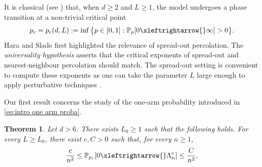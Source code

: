 \documentclass[11pt,a4paper]{article}
\numberwithin{equation}{section}
\theoremstyle{plain}
\newtheorem{Thm}{Theorem}[section]
\theoremstyle{definition}
\newcommand{\connect}{\xleftrightarrow}
\newcommand{\1}{\mathbf 1}
\def\P{\mathbb{P}} %
\def\bf{\bfseries}
\begin{document}
	It is classical (see \cite{GrimmettPercolation1999}) that, when $d\geq 2$ and $L\geq 1$, the model undergoes a phase transition at a non-trivial critical point
	\begin{equation}
	p_c=p_c(d,L):=\inf\big\{p\in[0,1]: \P_p[0\connect{}\infty]>0\big\}.
	\end{equation}
Hara and Slade \cite{HaraSlade1990Perco} first highlighted the relevance of spread-out percolation. The \emph{universality hypothesis} asserts that the critical exponents of spread-out and nearest-neighbour percolation should match. The spread-out setting is convenient to compute these exponents as one can take the parameter $L$ large enough to apply perturbative techniques \cite{HaraSladevdHofstad2003PercoSO,DumPan24Perco}. 
	
Our first result concerns the study of the one-arm probability introduced in \eqref{eq:intro one arm proba}.

	\begin{Thm}\label{thm: main result} Let $d>6$. There exists $L_0\geq 1$ such that the following holds. For every $L\geq L_0$, there exist $c,C>0$ such that, for every $n\geq 1$, 
	\begin{equation}\label{eq:main_bulk}
	\frac{c}{n^2}\leq \P_{p_c}[0\connect{} \Lambda_n^c] \leq \frac{C}{n^2},
	\end{equation}		
	\end{Thm}
	
\end{document}
